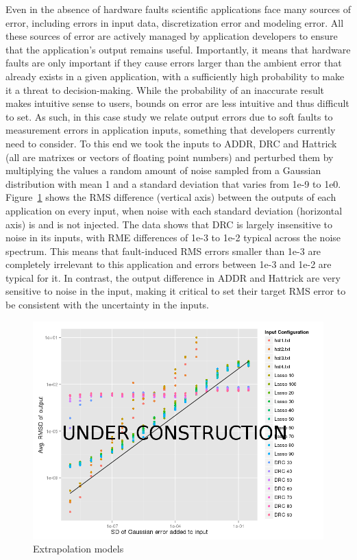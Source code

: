 \documentclass[10pt, conference, compsocconf]{IEEEtran}
\begin{document}
Even in the absence of hardware faults scientific applications face many sources of error, including errors in input data, discretization error and modeling error.
All these sources of error are actively managed by application developers to ensure that the application's output remains useful.
Importantly, it means that hardware faults are only important if they cause errors larger than the ambient error that already exists in a given application, with a sufficiently high probability to make it a threat to decision-making.
While the probability of an inaccurate result makes intuitive sense to users, bounds on error are less intuitive and thus difficult to set.
As such, in this case study we relate output errors due to soft faults to measurement errors in application inputs, something that developers currently need to consider.
To this end we took the inputs to ADDR, DRC and Hattrick (all are matrixes or vectors of floating point numbers) and perturbed them by multiplying the values a random amount of noise sampled from a Gaussian distribution with mean 1 and a standard deviation that varies from 1e-9 to 1e0.
Figure~\ref{fig:inputvarianceoutputrmsd} shows the RMS difference (vertical axis) between the outputs of each application on every input, when noise with each standard deviation (horizontal axis) is and is not injected.
The data shows that DRC is largely insensitive to noise in its inputs, with RME differences of 1e-3 to 1e-2 typical across the noise spectrum.
This means that fault-induced RMS errors smaller than 1e-3 are completely irrelevant to this application and errors between 1e-3 and 1e-2 are typical for it.
In contrast, the output difference in ADDR and Hattrick are very sensitive to noise in the input, making it critical to set their target RMS error to be consistent with the uncertainty in the inputs.

\begin{figure}[ht!]
\centering
\includegraphics[width=1.00\columnwidth]{figs/InputVarianceOutputRMSD.png}
\caption{Extrapolation models}
\label{fig:inputvarianceoutputrmsd}
\end{figure}
\end{document}
